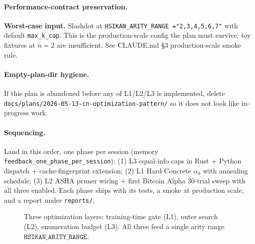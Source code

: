 \documentclass{article}
\begin{document}
\paragraph{Performance-contract preservation.}
\textbf{Worst-case input.}  Slashdot at \texttt{HSIKAN\_ARITY\_RANGE
="2,3,4,5,6,7"} with default \texttt{max\_k\_cap}.  This is the
production-scale config the plan must survive; toy fixtures at $n=2$
are insufficient.  See CLAUDE.md \S3 production-scale smoke rule.

\paragraph{Empty-plan-dir hygiene.}
If this plan is abandoned before any of L1/L2/L3 is implemented,
delete \texttt{docs/plans/2026-05-13-cn-optimization-pattern/} so it
does not look like in-progress work.

\paragraph{Sequencing.}
Land in this order, one phase per session
(memory \texttt{feedback\_one\_phase\_per\_session}):
(1) L3 equal-info caps in Rust + Python dispatch + cache-fingerprint
extension; (2) L1 Hard-Concrete $\alpha_k$ with annealing schedule;
(3) L2 ASHA pruner wiring + first Bitcoin Alpha 30-trial sweep with
all three enabled.  Each phase ships with its tests, a smoke at
production scale, and a report under \texttt{reports/}.

\begin{figure}[h]
\centering

\caption{Three optimization layers: training-time gate (L1), outer
search (L2), enumeration budget (L3).  All three feed a single arity
range $\texttt{HSIKAN\_ARITY\_RANGE}$.}
\end{figure}
\end{document}

